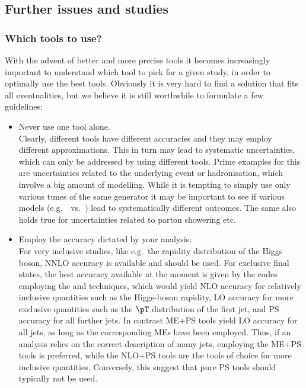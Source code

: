 \subsection{Further issues and studies}
\subsubsection{Which tools to use?}
With the advent of better and more precise tools it becomes increasingly
important to understand which tool to pick for a given study, in order
to optimally use the best tools. Obviously it is very hard to find a 
solution that fits all eventualities, but we believe it is still worthwhile
to formulate a few guidelines:
\begin{itemize}
\item Never use one tool alone.\\
      Clearly, different tools have different accuracies and they may employ
      different approximations.  This in turn may lead to systematic  
      uncertainties, which can only be addressed by using different tools.
      Prime examples for this are uncertainties related to the underlying
      event or hadronisation, which involve a big amount of modelling.  While
      it is tempting to simply use only various tunes of the same generator
      it may be important to see if various models (e.g.\ \pythiaeight\ vs.\ 
      \herwigpp) lead to systematically different outcomes.  The same also 
      holds true for uncertainties related to parton showering etc.
\item Employ the accuracy dictated by your analysis:\\
      For very inclusive studies, like e.g.\ the rapidity distribution
      of the Higgs boson, NNLO accuracy is available and should be used.  
      For exclusive final states, the best accuracy available at the moment
      is given by the codes employing the \POWHEG and \MCatNLO techniques,
      which would yield NLO accuracy for relatively inclusive quantities
      such as the Higgs-boson rapidity, LO accuracy for more exclusive
      quantities such as the $\pT$ distribution of the first jet,
      and PS accuracy for all further jets.  In contrast ME+PS tools yield
      LO accuracy for all jets, as long as the corresponding MEs have been
      employed.  Thus, if an analysis relies on the correct description of 
      many jets, employing the ME+PS tools is preferred, while the NLO+PS 
      tools are the tools of choice for more inclusive quantities.  Conversely,
      this suggest that pure PS tools should typically not be used.      
\end{itemize} 

